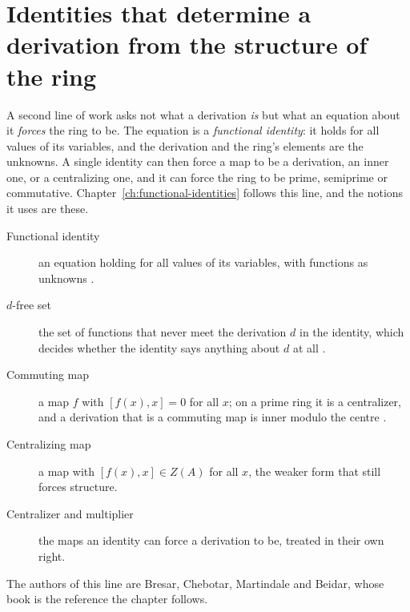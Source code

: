 \section*{Identities that determine a derivation from the structure of the ring}

A second line of work asks not what a derivation \emph{is} but what an
equation about it \emph{forces} the ring to be. The equation is a
\emph{functional identity}: it holds for all values of its variables, and the
derivation and the ring's elements are the unknowns. A single identity can then
force a map to be a derivation, an inner one, or a centralizing one, and it can
force the ring to be prime, semiprime or commutative. Chapter~\ref{ch:functional-identities}
follows this line, and the notions it uses are these.

\begin{description}
  \item[Functional identity] an equation holding for all values of its
    variables, with functions as unknowns \cite[p.~9]{BresarMartindaleChebotar2007FI}.
  \item[$d$-free set] the set of functions that never meet the derivation $d$
    in the identity, which decides whether the identity says anything about $d$
    at all \cite[p.~9]{BresarMartindaleChebotar2007FI}.
  \item[Commuting map] a map $f$ with $[f(x),x]=0$ for all $x$; on a prime ring
    it is a centralizer, and a derivation that is a commuting map is inner
    modulo the centre \cite[p.~385]{Bresar1993}.
  \item[Centralizing map] a map with $[f(x),x]\in Z(A)$ for all $x$, the weaker
    form that still forces structure.
  \item[Centralizer and multiplier] the maps an identity can force a derivation
    to be, treated in their own right.
\end{description}

The authors of this line are Bresar, Chebotar, Martindale and Beidar, whose
book is the reference the chapter follows.
